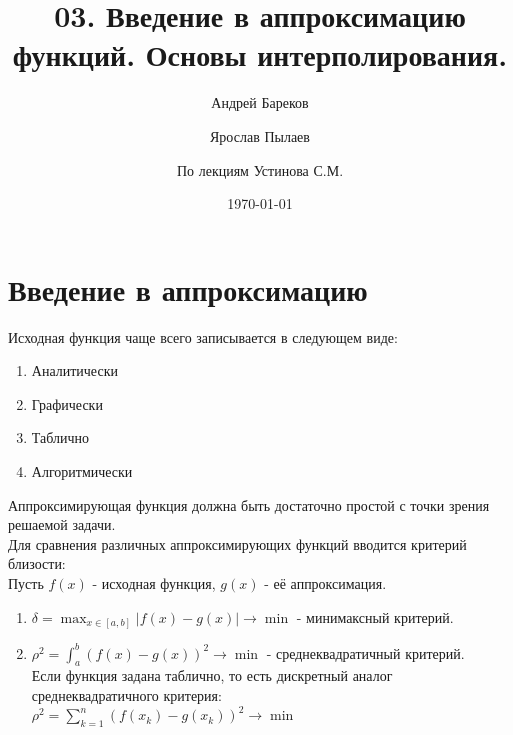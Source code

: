 \documentclass[a4paper,11pt]{article}
\title{03. Введение в аппроксимацию функций. Основы интерполирования.}
\author{Андрей Бареков \and Ярослав Пылаев \and По лекциям Устинова С.М.}
\date{\today}
\begin{document}
\maketitle
\newpage

\section{Введение в аппроксимацию}
Исходная функция чаще всего записывается в следующем виде:
\begin{enumerate}
  \item Аналитически
  \item Графически
  \item Таблично
  \item Алгоритмически
\end{enumerate}
Аппроксимирующая функция должна быть достаточно простой с точки зрения решаемой задачи. \\
\newline
Для сравнения различных аппроксимирующих функций вводится критерий близости: \\
Пусть $f(x)$ - исходная функция, $g(x)$ - её аппроксимация.
\begin{enumerate}
  \item \(\delta = \max_{x \in [a,b]} |f(x) - g(x)| \to \min\) - минимаксный критерий.
  \item \(\rho^2 = \int_{a}^{b} (f(x) - g(x))^2 \to \min\) - среднеквадратичный критерий. \\
        Если функция задана таблично, то есть дискретный аналог среднеквадратичного критерия: \\
        \(\rho^2 = \sum_{k=1}^{n} (f(x_k) - g(x_k))^2 \to \min\)
\end{enumerate}
\end{document}
